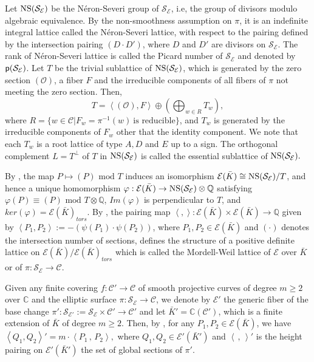 \documentclass[11pt]{amsart}
\newcommand{\Kb}{{{\bar K}}}
\newcommand{\Q}{{\mathbb Q}}
\newcommand{\CC}{{\mathbb C}}
\newcommand{\Cc}{{\mathcal C}}
\newcommand{\Ee}{{\mathcal E}}
\newcommand{\OO}{{\mathcal O}}
\newcommand{\Sc}{{\mathcal S}}
\numberwithin{equation}{section}
\numberwithin{table}{section}
\newcommand\<{\langle}
\def\mod{\mbox{ mod }}
\begin{document}
Let ${\rm NS} (\Sc_\Ee)$ be the {\sf N\'{e}ron-Severi group} of $\Sc_\Ee$, i.e, 
the group of divisors modulo algebraic equivalence.
By the non-smoothness assumption on $\pi$,  it is an  indefinite integral lattice called the  {\sf N\'{e}ron-Severi lattice},
with  respect to the  pairing defined by the intersection pairing $(D\cdot D')$, where $D$ and $D'$ are divisors on $\Sc_\Ee$.
The rank  of N\'{e}ron-Severi lattice is called the {\sf Picard number} of $\Sc_\Ee$ and denoted 
by ${\sf p}(\Sc_\Ee)$.
Let $T$ be the {\sf trivial sublattice} of  ${\rm NS} (\Sc_\Ee)$, which is  generated by the zero section $(\OO)$,  a fiber $F$ and
the irreducible components of all  fibers of $\pi$ not meeting the zero section. Then, 
$$T= \left\langle (\OO), F\right\rangle \oplus \left( \bigoplus_{w\in R} T_w \right),$$
where $R=\{ w\in \Cc | F_w=\pi^{-1}(w) \ \text{is reducible}\}$, and $T_w$ is generated by the irreducible components of $F_w$
other that  the identity component. We note that each $T_w$ is a root lattice of type $A, D$ and $E$ up to a sign.
The orthogonal complement $L=T^\perp$ of $T$ in ${\rm NS} (\Sc_\Ee)$   is called the {\sf essential sublattice}   of  ${\rm NS} (\Sc_\Ee).$

By \cite[Theorem 1.3]{Shioda1990a}, the map $P \mapsto (P)  \mod  T$ induces an isomorphism $\Ee(\Kb) \cong {\rm NS} (\Sc_\Ee)/T$, and hence 
a unique homomorphism $\varphi: \Ee(\Kb) \rightarrow {\rm NS} (\Sc_\Ee) \otimes \Q$ satisfying 
$\varphi(P) \equiv (P) \mod  T\otimes \Q$, $Im(\varphi)$ is perpendicular to $T$, and 
$ker(\varphi)= \Ee(\Kb)_{tors}$. By \cite[Theorem 8.4]{Shioda1990a},  the pairing map 
$\left\langle ,  \right\rangle : \Ee(\Kb) \times \Ee(\Kb) \rightarrow \Q$ given by 
$\left\langle P_1, P_2\right\rangle := - \left(\psi(P_1)\cdot \psi(P_2) \right)$,
where $P_1, P_2 \in \Ee(\Kb)$ and $(\cdot )$ denotes the intersection number of sections, 
defines the structure of a positive definite lattice on $\Ee(\Kb)/\Ee(\Kb)_{tors}$ which is called the {\sf Mordell-Weil lattice } of
$\Ee$ over $\Kb$ or of  $\pi: \Sc_\Ee \rightarrow \Cc$.  

Given any finite covering $f : \Cc' \rightarrow \Cc$ of smooth projective curves of degree $m\geq 2$ over $\CC$ and the elliptic surface   $\pi: \Sc_\Ee \rightarrow \Cc$, we denote by  $\Ee'$ the generic fiber of the  base change $\pi': \Sc_{\Ee'}:=\Sc_\Ee \times \Cc' \rightarrow \Cc'$ and let $\Kb'=\CC(\Cc')$, which is a  finite extension of $\Kb$ of degree $m\geq 2$. Then, 
by \cite[Proposition 8.12]{Shioda1990a}, for any
$P_1, P_2 \in \Ee(\Kb)$, we have 
$\left\langle Q_1 , Q_2\right\rangle' =m \cdot \left\langle P_1\, ,\, P_2\right\rangle,$
where $Q_1 , Q_2 \in \Ee'(\Kb')$  and 
$\left\langle \, ,\,\right\rangle'$ is the height pairing on  $\Ee'(\Kb')$ the set of global sections of $\pi'.$
\end{document}
